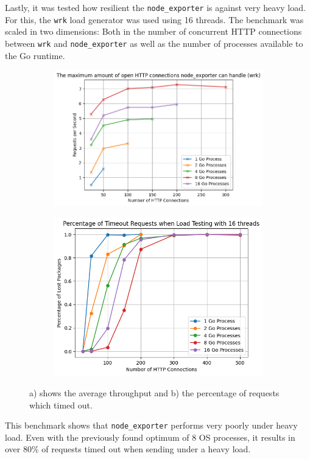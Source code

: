 Lastly, it was tested how resilient the \texttt{node\_exporter} is against very heavy load. For this, the \texttt{wrk} load generator was used using 16 threads. The benchmark was scaled in two dimensions: Both in the number of concurrent HTTP connections between \texttt{wrk} and \texttt{node\_exporter} as well as the number of processes available to the Go runtime.
\begin{figure}[H]
\centering
\begin{subfigure}{.5\textwidth}
  \centering
  \includegraphics[width=\textwidth]{./plots/node_exporter_throughput.png}
  \caption{}
\end{subfigure}%
\begin{subfigure}{.5\textwidth}
  \centering
  \includegraphics[width=\textwidth]{./plots/node_exporter_errors.png}
  \caption{}
\end{subfigure}
  \caption{a) shows the average throughput and b) the percentage of requests which timed out.}
\end{figure}
This benchmark shows that \texttt{node\_exporter} performs very poorly under heavy load. Even with the previously found optimum of 8 OS processes, it results in over 80\% of requests timed out when sending under a heavy load.
